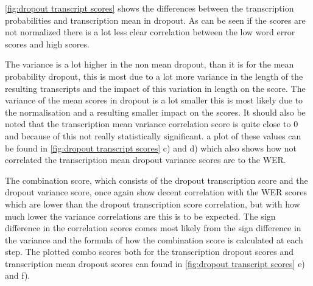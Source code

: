 \autoref{fig:dropout transcript scores} shows the differences between the transcription probabilities and transcription mean in dropout. 
As can be seen if the scores are not normalized there is a lot less clear correlation between the low word error scores and high scores. 

The variance is a lot higher in the non mean dropout, than it is for the mean probability dropout, this is most due to a lot more variance in the length of the resulting transcripts and the impact of this variation in length on the score. The variance of the mean scores in dropout is a lot smaller this is most likely due to the normalisation and a resulting smaller impact on the scores. It should also be noted that the transcription mean variance correlation score is quite close to 0 and because of this not really statistically significant. a plot of these values can be found in \autoref{fig:dropout transcript scores} c) and d) which also shows how not correlated the transcription mean dropout variance scores are to the WER. 

The combination score, which consists of the dropout transcription score and the dropout variance score, once again show decent correlation with the WER scores which are lower than the dropout transcription score correlation, but with how much lower the variance correlations are this is to be expected. The sign difference in the correlation scores comes most likely from the sign difference in the variance and the formula of how the combination score is calculated at each step. The plotted combo scores both for the transcription dropout scores and transcription mean dropout scores can found in \autoref{fig:dropout transcript scores} e) and f). 

